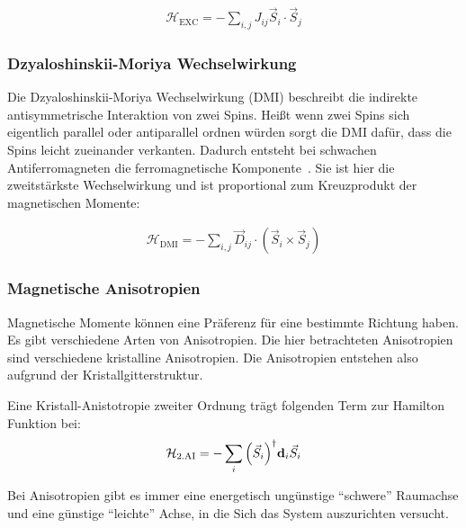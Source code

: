 \documentclass[main.tex]{subfiles}
\begin{document}
\begin{align}
	\mathcal{H}_{\text{EXC}} = -\sum_{i,j} J_{ij} \vec{S}_i \cdot
	\vec{S}_j\label{eq:hamilton-heisenberg-exc}
\end{align}

\subsubsection*{Dzyaloshinskii-Moriya Wechselwirkung}

Die Dzyaloshinskii-Moriya Wechselwirkung (DMI) beschreibt die indirekte antisymmetrische Interaktion von zwei Spins. Heißt wenn zwei Spins sich eigentlich parallel oder antiparallel ordnen würden sorgt die DMI dafür, dass die Spins leicht zueinander verkanten. Dadurch entsteht bei schwachen Antiferromagneten die ferromagnetische Komponente~\cite{DMI}.
Sie ist hier die zweitstärkste Wechselwirkung und ist proportional zum Kreuzprodukt der magnetischen Momente:

\begin{align}
	\mathcal{H}_{\text{DMI}} = -\sum_{i,j} \vec{D}_{ij} \cdot (\vec{S}_i
	\times
	\vec{S}_j)\label{eq:hamilton-dmi}
\end{align}


\subsubsection*{Magnetische Anisotropien}
Magnetische Momente können eine Präferenz für eine bestimmte Richtung haben.
Es gibt verschiedene Arten von Anisotropien.
Die hier betrachteten Anisotropien sind verschiedene kristalline Anisotropien.
Die Anisotropien entstehen also aufgrund der Kristallgitterstruktur. 

Eine Kristall-Anistotropie zweiter Ordnung trägt folgenden Term zur Hamilton Funktion bei:
\begin{align}
	\mathcal{H}_{\text{2.AI}} = -\sum_{i} \qty(\vec{S}_i)^\dagger
	\bm{\mathrm{d}}_i
	\vec{S}_i\label{eq:hamilton-2a}
\end{align}

Bei Anisotropien gibt es immer eine energetisch ungünstige \enquote{schwere} Raumachse und eine günstige \enquote{leichte} Achse, in die Sich das System auszurichten versucht.
\end{document}
